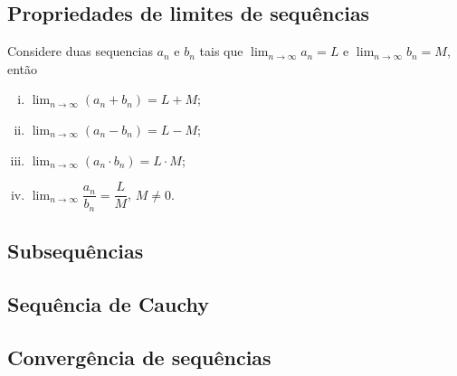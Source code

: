    \subsection{Propriedades de limites de sequências}
   \begin{stat}
      Considere duas sequencias ${a_{n}}$ e ${b_{n}}$ tais que $\lim_{n\to\infty} a_{n} = L$ e $\lim_{n\to\infty} b_{n} = M$, então
      \begin{enumerate}[i.]
         \item $\lim_{n\to\infty} (a_{n} + b_{n}) = L + M$;
         \item $\lim_{n\to\infty} (a_{n} - b_{n}) = L - M$;
         \item $\lim_{n\to\infty} (a_{n} \cdot b_{n}) = L \cdot M$;
         \item $\lim_{n\to\infty}\dfrac{a_{n}}{b_{n}} = \dfrac{L}{M}$, $M \neq 0.$
      \end{enumerate}
   \end{stat}
   \subsection{Subsequências}
   \subsection{Sequência de Cauchy}

   \subsection{Convergência de sequências}
